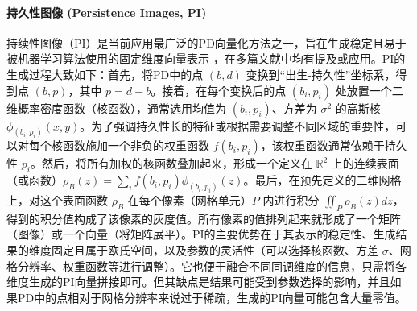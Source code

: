\paragraph{持久性图像 (Persistence Images, PI)}
\label{sec:feat_pi}
持续性图像（PI）\cite{pun2022persistent}是当前应用最广泛的PD向量化方法之一，旨在生成稳定且易于被机器学习算法使用的固定维度向量表示 ，在多篇文献中均有提及或应用。PI的生成过程大致如下：首先，将PD中的点 $(b, d)$ 变换到“出生-持久性”坐标系，得到点 $(b, p)$，其中 $p = d-b$。接着，在每个变换后的点 $(b_i, p_i)$ 处放置一个二维概率密度函数（核函数），通常选用均值为 $(b_i, p_i)$、方差为 $\sigma^2$ 的高斯核 $\phi_{(b_i, p_i)}(x, y)$。为了强调持久性长的特征或根据需要调整不同区域的重要性，可以对每个核函数施加一个非负的权重函数 $f(b_i, p_i)$，该权重函数通常依赖于持久性 $p_i$。然后，将所有加权的核函数叠加起来，形成一个定义在 $\mathbb{R}^2$ 上的连续表面（或函数）$\rho_{B}(z) = \sum_i f(b_i, p_i) \phi_{(b_i, p_i)}(z)$。最后，在预先定义的二维网格上，对这个表面函数 $\rho_B$ 在每个像素（网格单元）$P$ 内进行积分 $\iint_P \rho_B(z) dz$，得到的积分值构成了该像素的灰度值。所有像素的值排列起来就形成了一个矩阵（图像）或一个向量（将矩阵展平）。PI的主要优势在于其表示的稳定性、生成结果的维度固定且属于欧氏空间，以及参数的灵活性（可以选择核函数、方差 $\sigma$、网格分辨率、权重函数等进行调整）。它也便于融合不同同调维度的信息，只需将各维度生成的PI向量拼接即可。但其缺点是结果可能受到参数选择的影响，并且如果PD中的点相对于网格分辨率来说过于稀疏，生成的PI向量可能包含大量零值。

